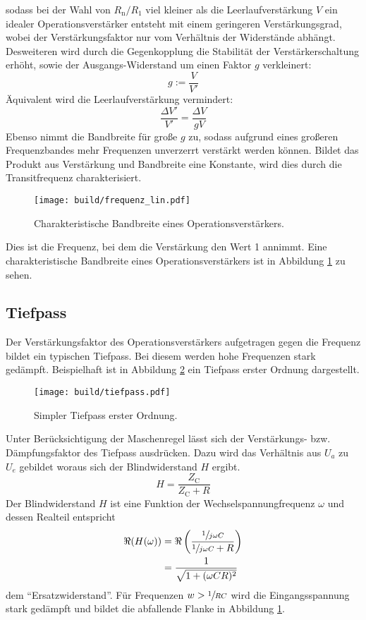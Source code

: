 sodass bei der Wahl von $R_\text{n}/ R_\text{1}$ viel kleiner als die
Leerlaufverstärkung $V$ ein idealer Operationsverstärker entsteht mit einem
geringeren Verstärkungsgrad,
wobei der Verstärkungsfaktor nur vom Verhältnis der Widerstände abhängt.
Desweiteren wird durch die Gegenkopplung die Stabilität der
Verstärkerschaltung erhöht, sowie der Ausgangs-Widerstand um einen
Faktor $g$ verkleinert:
\begin{equation}
		g := \frac{V}{V'}
\end{equation}
Äquivalent wird die Leerlaufverstärkung vermindert:
\begin{equation}
		\frac{\Delta V'}{V'} = \frac{\Delta V}{g V}
\end{equation}
Ebenso nimmt die Bandbreite für große $g$ zu, sodass aufgrund eines großeren
Frequenzbandes mehr Frequenzen unverzerrt verstärkt werden können.
Bildet das Produkt aus Verstärkung und Bandbreite eine Konstante,
wird dies durch die Transitfrequenz charakterisiert.
\begin{figure}[h]
		\centering
		\texttt{[image: build/frequenz\_lin.pdf]}
		\caption{Charakteristische Bandbreite eines Operationsverstärkers.\cite{anleitung}}
		\label{fig:freq}
\end{figure}
Dies ist die Frequenz, bei dem die Verstärkung den Wert 1 annimmt.
Eine charakteristische Bandbreite eines Operationsverstärkers ist in Abbildung
\ref{fig:freq} zu sehen.

\subsection{Tiefpass}%
\label{sub:tiefpass}

Der Verstärkungsfaktor des Operationsverstärkers aufgetragen gegen die Frequenz bildet ein typischen Tiefpass.
Bei diesem werden hohe Frequenzen stark gedämpft.
Beispielhaft ist in Abbildung \ref{fig:tiefpass} ein Tiefpass erster Ordnung
dargestellt.
\begin{figure}[h]
		\centering
		\texttt{[image: build/tiefpass.pdf]}
		\caption{Simpler Tiefpass erster Ordnung. \cite{wiki}}
		\label{fig:tiefpass}
\end{figure}
Unter Berücksichtigung der Maschenregel lässt sich der Verstärkungs- bzw.
Dämpfungsfaktor des Tiefpass ausdrücken.
Dazu wird das Verhältnis aus $U_a$ zu $U_e$ gebildet woraus sich der
Blindwiderstand $H$ ergibt.
\begin{equation}
		\label{eq:blindwiederstand}
		H = \frac{Z_\text{C}}{Z_\text{C} + R}
\end{equation}
Der Blindwiderstand $H$ ist eine Funktion der Wechselspannungfrequenz $\omega$
und dessen Realteil entspricht
\begin{align}
		\label{eq:h_betrag}
		\Re(H(\omega))  &= \Re \left(\frac{\sfrac{1}{j \omega C}}{\sfrac{1}{j\omega
		C} + R} \right) \\
    &= \frac{1}{\sqrt{1 + (\omega CR)^2}} \label{eq:tiefpass}
\end{align}
dem \enquote{Ersatzwiderstand}.
Für Frequenzen $w > \sfrac{1}{RC}$ wird die Eingangsspannung stark gedämpft und bildet
die abfallende Flanke in Abbildung \ref{fig:freq}.

